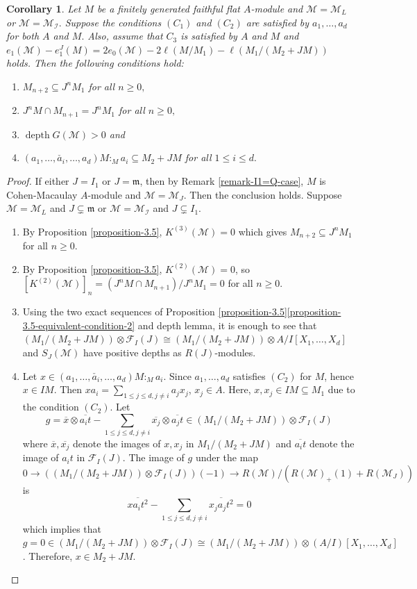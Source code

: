 \documentclass[11pt,reqno]{amsart}
\newtheorem{corollary}[theorem]{Corollary}
\theoremstyle{definition}
\newcommand{\m}{\mathfrak m}
\def\F{{\mathcal F}}
\def\M{{\mathcal M}}
\def\I{{\mathcal I}}
\DeclareMathOperator{\depth}{depth}
\numberwithin{equation}{section}
\begin{document}
\begin{corollary}\label{corollary-3.6} Let $M$ be a finitely generated faithful flat $A$-module and $\M=\M_L$ or $\M=\M_\I.$ Suppose the conditions $(C_1)$ and $(C_2)$  are satisfied by $a_1,\ldots,a_d$ for both $A$ and $M.$ Also, assume that $C_3$ is satisfied by $A$ and $M$ and  $e_1(\M)-e_1^J(M)=2e_0(\M)-2\ell(M/M_1)-\ell(M_1/(M_2+JM))$ holds. Then the following conditions hold:
	\begin{enumerate}[label=(\roman*)]
		\item $M_{n+2}\subseteq J^n M_1$ for all $n\geq 0, $
		\item $J^nM\cap M_{n+1}=J^n M_1$ for all $n\geq 0,$
		\item $\depth G(\mathcal{\M})>0$ and 
		\item $(a_1,\ldots,\check{a_i},\ldots,a_d)M:_Ma_i\subseteq M_2+JM$ for all $1\leq i\leq d.$
	\end{enumerate}
\end{corollary}
\begin{proof}
	If either $J=I_1$ or $J=\m$, then by Remark \ref{remark-I1=Q-case}, $M$ is Cohen-Macaulay $A$-module and $\M=\M_J$. Then the conclusion holds. 
	Suppose $\M=\M_L$ and $J\subsetneq \m $ or $\M=\M_\I$ and $J\subsetneq I_1.$ 
	\begin{enumerate}[label=(\roman*)]
		\item By Proposition \ref{proposition-3.5}, $K^{(3)}(\M)=0$ which gives $M_{n+2}\subseteq J^n M_1 $ for all $n\geq 0$. 
		\item By Proposition \ref{proposition-3.5}, $K^{(2)}(\M)=0$, so $[K^{(2)}(\M)]_n=(J^nM\cap M_{n+1})/J^n M_1=0$ for all $n\geq 0.$
		\item Using the two exact sequences of Proposition \ref{proposition-3.5}\ref{proposition-3.5-equivalent-condition-2}  and depth lemma, it is enough to see that $(M_1/(M_2+JM))\otimes \F_I(J)\cong (M_1/(M_2+JM))\otimes A/I[X_1,\ldots,X_d]$ and $S_J(\M)$ have positive depths as $R(J)$-modules. 
		\item Let $x\in (a_1,\ldots,\check{a_i},\ldots,a_d)M:_Ma_i$. Since $a_1,\ldots,a_d$ satisfies $(C_2)$ for $M$, hence $x\in IM$. Then $xa_i=\mathop\sum\limits_{1\leq j\leq d, j\neq i} a_jx_j$, $x_j\in A$. Here, $x,x_j\in IM\subseteq M_1$ due to the condition $(C_2)$. Let 
		$$g=\overline{x}\otimes \overline{a_it}-\mathop\sum\limits_{1\leq j\leq d, j\neq i} \overline{x_j}\otimes \overline{a_jt}\in (M_1/(M_2+JM))\otimes \F_I(J)$$
		where $\overline{x}, \overline{x_j}$ denote the images of $x,x_j$ in $M_1/(M_2+JM)$ and $\overline{a_it}$ denote the image of $a_it$ in $\F_I(J)$. The image of $g$ under the map $0\to ((M_1/(M_2+JM))\otimes \F_I(J))(-1)\to R(\M)/(R(\M)_+(1)+R(\M_J))$ is 
		$$\overline{xa_it^2}-\mathop\sum\limits_{1\leq j\leq d,j\neq i} \overline{x_ja_jt^2}=0$$
		which implies that $g=0\in (M_1/(M_2+JM))\otimes \F_I(J) \cong (M_1/(M_2+JM))\otimes (A/I)[X_1,\ldots,X_d]$. Therefore, $x\in M_2+JM.$\qedhere
	\end{enumerate}
\end{proof}
\end{document}
